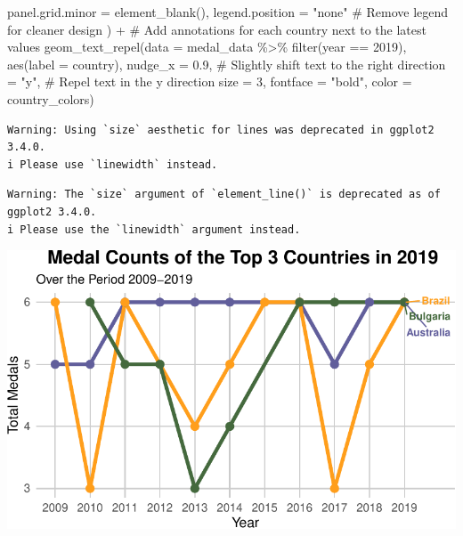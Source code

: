 \documentclass[
  letterpaper,
  DIV=11,
  numbers=noendperiod]{scrartcl}
\newenvironment{Shaded}{\begin{snugshade}}{\end{snugshade}}
\newcommand{\AttributeTok}[1]{\textcolor[rgb]{0.40,0.45,0.13}{#1}}
\newcommand{\CommentTok}[1]{\textcolor[rgb]{0.37,0.37,0.37}{#1}}
\newcommand{\DecValTok}[1]{\textcolor[rgb]{0.68,0.00,0.00}{#1}}
\newcommand{\FloatTok}[1]{\textcolor[rgb]{0.68,0.00,0.00}{#1}}
\newcommand{\FunctionTok}[1]{\textcolor[rgb]{0.28,0.35,0.67}{#1}}
\newcommand{\NormalTok}[1]{\textcolor[rgb]{0.00,0.23,0.31}{#1}}
\newcommand{\SpecialCharTok}[1]{\textcolor[rgb]{0.37,0.37,0.37}{#1}}
\newcommand{\StringTok}[1]{\textcolor[rgb]{0.13,0.47,0.30}{#1}}
\begin{document}
\begin{Shaded}
\begin{Highlighting}[]
    \AttributeTok{panel.grid.minor =} \FunctionTok{element\_blank}\NormalTok{(),}
    \AttributeTok{legend.position =} \StringTok{"none"} \CommentTok{\# Remove legend for cleaner design}
\NormalTok{  ) }\SpecialCharTok{+}
 \CommentTok{\# Add annotations for each country next to the latest values}
  \FunctionTok{geom\_text\_repel}\NormalTok{(}\AttributeTok{data =}\NormalTok{ medal\_data }\SpecialCharTok{\%\textgreater{}\%} \FunctionTok{filter}\NormalTok{(year }\SpecialCharTok{==} \DecValTok{2019}\NormalTok{), }
                  \FunctionTok{aes}\NormalTok{(}\AttributeTok{label =}\NormalTok{ country), }
                  \AttributeTok{nudge\_x =} \FloatTok{0.9}\NormalTok{, }\CommentTok{\# Slightly shift text to the right}
                  \AttributeTok{direction =} \StringTok{"y"}\NormalTok{, }\CommentTok{\# Repel text in the y direction}
                  \AttributeTok{size =} \DecValTok{3}\NormalTok{, }\AttributeTok{fontface =} \StringTok{"bold"}\NormalTok{, }\AttributeTok{color =}\NormalTok{ country\_colors)}
\end{Highlighting}
\end{Shaded}

\begin{verbatim}
Warning: Using `size` aesthetic for lines was deprecated in ggplot2 3.4.0.
i Please use `linewidth` instead.
\end{verbatim}

\begin{verbatim}
Warning: The `size` argument of `element_line()` is deprecated as of ggplot2 3.4.0.
i Please use the `linewidth` argument instead.
\end{verbatim}

\includegraphics{proj_EDA_f24_sbekova_files/figure-pdf/unnamed-chunk-5-1.pdf}
\end{document}
